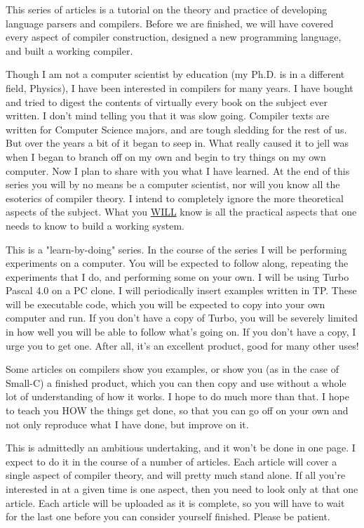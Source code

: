 \documentclass[float=false, crop=false]{standalone}
\begin{document}
This series of articles is a tutorial on the theory and practice of developing
language parsers and compilers. Before we are finished, we will have covered
every aspect of compiler construction, designed a new programming language, and
built a working compiler.

Though I am not a computer scientist by education (my Ph.D. is in a different
field, Physics), I have been interested in compilers for many years. I have
bought and tried to digest the contents of virtually every book on the subject
ever written. I don't mind telling you that it was slow going. Compiler texts
are written for Computer Science majors, and are tough sledding for the rest of
us. But over the years a bit of it began to seep in. What really caused it to
jell was when I began to branch off on my own and begin to try things on my own
computer. Now I plan to share with you what I have learned. At the end of this
series you will by no means be a computer scientist, nor will you know all the
esoterics of compiler theory. I intend to completely ignore the more theoretical
aspects of the subject. What you \underline{WILL} know is all the practical
aspects that one needs to know to build a working system.

This is a "learn-by-doing" series. In the course of the series I will be
performing experiments on a computer. You will be expected to follow along,
repeating the experiments that I do, and performing some on your own. I will be
using Turbo Pascal 4.0 on a PC clone. I will periodically insert examples
written in TP. These will be executable code, which you will be expected to copy
into your own computer and run. If you don't have a copy of Turbo, you will be
severely limited in how well you will be able to follow what's going on. If you
don't have a copy, I urge you to get one. After all, it's an excellent product,
good for many other uses!

Some articles on compilers show you examples, or show you (as in the case of
Small-C) a finished product, which you can then copy and use without a whole lot
of understanding of how it works. I hope to do much more than that. I hope to
teach you HOW the things get done, so that you can go off on your own and not
only reproduce what I have done, but improve on it.

This is admittedly an ambitious undertaking, and it won't be done in one page. I
expect to do it in the course of a number of articles. Each article will cover a
single aspect of compiler theory, and will pretty much stand alone. If all
you're interested in at a given time is one aspect, then you need to look only
at that one article. Each article will be uploaded as it is complete, so you
will have to wait for the last one before you can consider yourself finished.
Please be patient.
\end{document}
